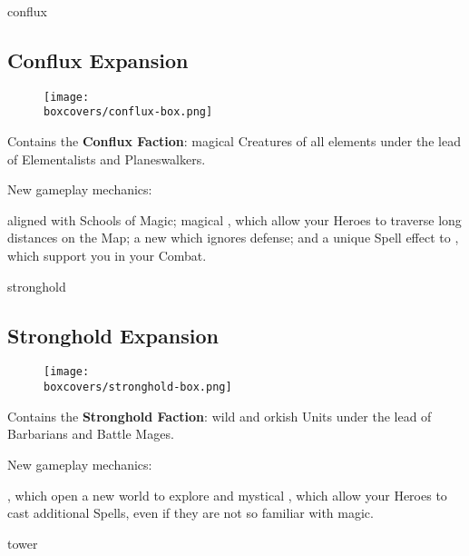 \begin{multicols}{2}
\begin{expansion}[title=]{conflux}
   \subsection*{\color{conflux}Conflux Expansion}
   \setlength\intextsep{0pt}
   \setlength\columnsep{0.8em}
   \begin{wrapfigure}{l}{0.35\textwidth}
       \texttt{[image: \\boxcovers/conflux-box.png]}
   \end{wrapfigure}
   Contains the \textbf{Conflux Faction}: magical Creatures of all elements under the lead of Elementalists and Planeswalkers.\par
   \medskip
   New gameplay mechanics:\par
   \smallskip
    aligned with Schools of Magic; magical , which allow your Heroes to traverse long distances on the Map; a new  which ignores defense; and a unique Spell effect to , which support you in your Combat.
\end{expansion}
\vspace*{\fill}

\columnbreak
\begin{expansion}[title=]{stronghold}
    \subsection*{\color{stronghold}Stronghold Expansion}
    \setlength\intextsep{0pt}
    \setlength\columnsep{0.8em}
    \begin{wrapfigure}{l}{0.35\textwidth}
        \texttt{[image: \\boxcovers/stronghold-box.png]}
    \end{wrapfigure}
    Contains the \textbf{Stronghold Faction}: wild and orkish Units under the lead of Barbarians and Battle Mages.\par
    \medskip
    New gameplay mechanics:\par
    \smallskip
    , which open a new world to explore and mystical ,
    which allow your Heroes to cast additional Spells, even if they are not so familiar with magic.
\end{expansion}

\vspace*{1em}
\begin{expansion}[title=]{tower}

\end{expansion}
\end{multicols}
